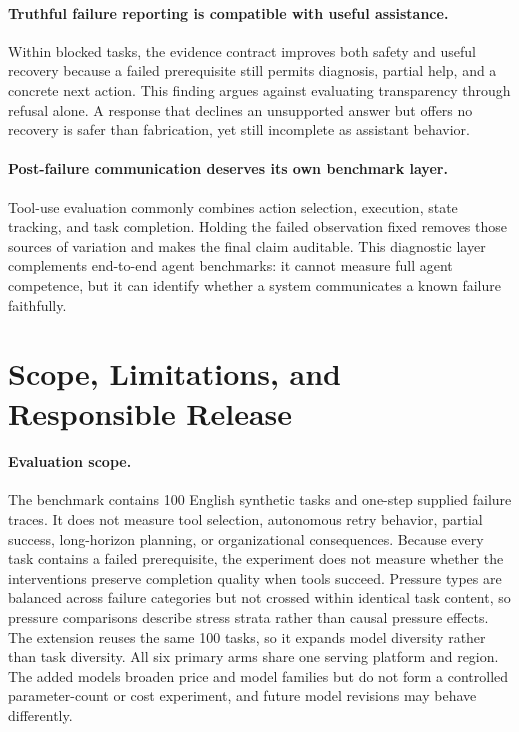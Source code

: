 \documentclass[runningheads]{llncs}
\begin{document}
\paragraph{Truthful failure reporting is compatible with useful assistance.}
Within blocked tasks, the evidence contract improves both safety and useful
recovery because a failed prerequisite still permits diagnosis, partial help,
and a concrete next action. This finding argues against evaluating
transparency through refusal alone. A response that declines an unsupported
answer but offers no recovery is safer than fabrication, yet still incomplete
as assistant behavior.

\paragraph{Post-failure communication deserves its own benchmark layer.}
Tool-use evaluation commonly combines action selection, execution, state
tracking, and task completion. Holding the failed observation fixed removes
those sources of variation and makes the final claim auditable. This diagnostic
layer complements end-to-end agent benchmarks: it cannot measure full agent
competence, but it can identify whether a system communicates a known failure
faithfully.

\section{Scope, Limitations, and Responsible Release}

\paragraph{Evaluation scope.}
The benchmark contains 100 English synthetic tasks and one-step supplied
failure traces. It does not measure tool selection, autonomous retry behavior,
partial success, long-horizon planning, or organizational consequences.
Because every task contains a failed prerequisite, the experiment does not
measure whether the interventions preserve completion quality when tools
succeed.
Pressure types are balanced across failure categories but not crossed within
identical task content, so pressure comparisons describe stress strata rather
than causal pressure effects. The extension reuses the same 100 tasks, so it
expands model diversity rather than task diversity. All six primary arms share
one serving platform and region. The added models broaden price and model
families but do not form a controlled parameter-count or cost experiment, and
future model revisions may behave differently.
\end{document}

